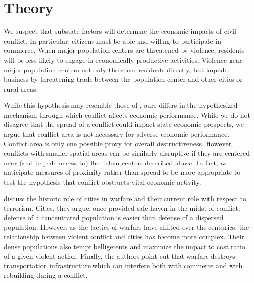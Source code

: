 \section{Theory}
\label{theory}



We suspect that substate factors will determine the economic impacts of civil conflict.  In particular, citizens must be able and willing to participate in commerce.  When major population centers are threatened by violence, residents will be less likely to engage in economically productive activities.  Violence near major population centers not only threatens residents directly, but impedes business by threatening trade between the population center and other cities or rural areas.  


While this hypothesis may resemble those of \cite{imai:weinstein:2000}, ours differs in the hypothesized mechanism through which conflict affects economic performance.  While we do not disagree that the spread of a conflict could impact state economic prospects, we argue that conflict area is not necessary for adverse economic performance.  Conflict area is only one possible proxy for overall destructiveness.  However, conflicts with smaller spatial areas can be similarly disruptive if they are centered near (and impede access to) the urban centers described above.  In fact, we anticipate measures of proximity rather than spread to be more appropriate to test the hypothesis that conflict obstructs vital economic activity.

\cite{glaeser:shapiro:2002} discuss the historic role of cities in warfare and their current role with respect to terrorism. Cities, they argue, once provided safe haven in the midst of conflict; defense of a concentrated population is easier than defense of a dispersed population. However, as the tactics of warfare have shifted over the centuries, the relationship between violent conflict and cities has become more complex. Their dense populations also tempt belligerents and maximize the impact to cost ratio of a given violent action. Finally, the authors point out that warfare destroys transportation infrastructure which can interfere both with commerce and with rebuilding during a conflict.  

